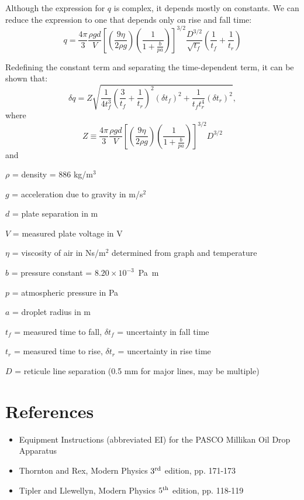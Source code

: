 Although the expression for $q$ is complex, it depends mostly on constants. We
can reduce the expression to one that depends only on rise and fall time:
\begin{equation}
q = \frac{4\pi}{3} \frac{\rho g d}{V} \left[ \left(\frac{9\eta}{2\rho g}\right)
  \left(\frac{1}{1 + \frac{b}{p a}}\right) \right]^{3/2} \frac{D^{3/2}}{\sqrt{t_f}}
\left(\frac{1}{t_f} + \frac{1}{t_r} \right)
\end{equation}

Redefining the constant term and separating the time-dependent term, it can be
shown that:
\begin{equation}
\delta q = Z \sqrt{ \frac{1}{4t_f^3} \left( \frac{3}{t_f} +
  \frac{1}{t_r}\right)^2 (\delta t_f)^2 + \frac{1}{t_f t_r^4} (\delta t_r)^2 },
\end{equation}
\noindent where 
\begin{equation}
Z \equiv \frac{4\pi}{3} \frac{\rho g d}{V} \left[ \left(\frac{9\eta}{2\rho g}\right)
  \left(\frac{1}{1 + \frac{b}{p a}}\right) \right]^{3/2} D^{3/2}
\end{equation}
\noindent and
\begin{itemize*}
\item $\rho$ = density = 886 kg/m$^3$
\item $g$ = acceleration due to gravity in m/s$^2$
\item $d$ = plate separation in m
\item $V$ = measured plate voltage in V
\item $\eta$ = viscosity of air in Ns/m$^2$ determined from graph and
  temperature 
\item $b$ = pressure constant = $8.20\times10^{-3}$~Pa~m
\item $p$ = atmospheric pressure in Pa
\item $a$ = droplet radius in m
\item $t_f$ = measured time to fall, $\delta t_f$ = uncertainty in fall time
\item $t_r$ = measured time to rise, $\delta t_r$ = uncertainty in rise time
\item $D$ = reticule line separation (0.5 mm for major lines, may be multiple)
\end{itemize*}

\section{References}

\begin{itemize}
\item Equipment Instructions (abbreviated EI) for the PASCO Millikan Oil Drop Apparatus
\item Thornton and Rex, Modern Physics $3^{\rm rd}$ edition, pp. 171-173
\item Tipler and Llewellyn, Modern Physics $5^{\rm th}$ edition, pp. 118-119
\end{itemize}

